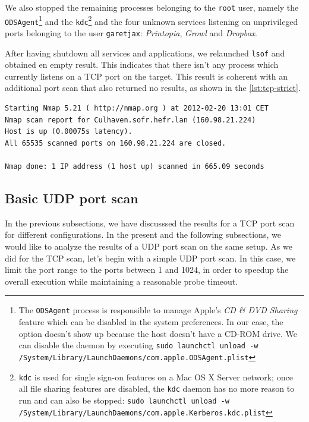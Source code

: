 \documentclass[10pt,a4paper,twoside,onecolumn]{article}
\begin{document}
We also stopped the remaining processes belonging to the \texttt{root} user, namely the \texttt{ODSAgent}\footnote{The \texttt{ODSAgent} process is responsible to manage Apple's \emph{CD \& DVD Sharing} feature which can be disabled in the system preferences. In our case, the option doesn't show up because the host doesn't have a CD-ROM drive. We can disable the daemon by executing \texttt{sudo launchctl unload -w /System/Library/LaunchDaemons/com.apple.ODSAgent.plist}}
and the \texttt{kdc}\footnote{\texttt{kdc} is used for single sign-on features on a Mac OS X Server network; once all file sharing features are disabled, the \texttt{kdc} daemon has no more reason to run and can also be stopped: \texttt{sudo launchctl unload -w /System/Library/LaunchDaemons/com.apple.Kerberos.kdc.plist}}
and the four unknown services listening on unprivileged ports belonging to the user \texttt{garetjax}: \emph{Printopia}, \emph{Growl} and \emph{Dropbox}.

After having shutdown all services and applications, we relaunched \texttt{lsof} and obtained en empty result. This indicates that there isn't any process which currently listens on a TCP port on the target. This result is coherent with an additional port scan that also returned no results, as shown in the \autoref{lst:tcp-strict}.

\begin{lstlisting}
Starting Nmap 5.21 ( http://nmap.org ) at 2012-02-20 13:01 CET
Nmap scan report for Culhaven.sofr.hefr.lan (160.98.21.224)
Host is up (0.00075s latency).
All 65535 scanned ports on 160.98.21.224 are closed.

Nmap done: 1 IP address (1 host up) scanned in 665.09 seconds
\end{lstlisting}

\subsection{Basic UDP port scan}

In the previous subsections, we have discusssed the results for a TCP port scan for different configurations. In the present and the following subsections, we would like to analyze the results of a UDP port scan on the same setup. As we did for the TCP scan, let's begin with a simple UDP port scan. In this case, we limit the port range to the ports between 1 and 1024, in order to speedup the overall execution while maintaining a reasonable probe timeout.
\end{document}
